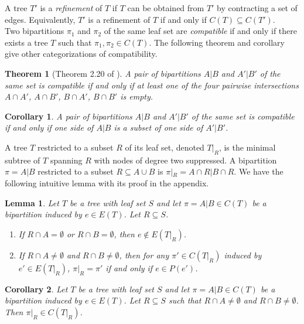 \documentclass{bmcart}
\newtheorem{theorem}{Theorem}
\newtheorem{lemma}{Lemma}
\newtheorem{corollary}{Corollary}
\begin{document}
A tree $T'$ is a \textit{refinement} of $T$ if $T$ can be obtained from $T'$ by contracting a set of edges. Equivalently, $T'$ is a refinement of $T$ if and only if $C(T) \subseteq C(T')$.\\

Two bipartitions $\pi_1$ and $\pi_2$ of the same leaf set are \textit{compatible} if and only if there exists a tree $T$ such that $\pi_1, \pi_2 \in C(T)$. The following theorem and corollary give other categorizations of compatibility.
\begin{theorem}[Theorem 2.20 of \cite{warnow2017computational}]\label{thm:compatibility}
    A pair of bipartitions $A|B$ and $A'|B'$ of the same set is compatible if and only if at least one of the four pairwise intersections $A \cap A'$, $A\cap B'$, $B\cap A'$, $B \cap B'$ is empty. 
\end{theorem}

\begin{corollary}\label{cor:compatibility}
     A pair of bipartitions $A|B$ and $A'|B'$ of the same set is compatible if and only if one side of $A|B$ is a subset of one side of $A'|B'$.
\end{corollary}
\medskip

A tree $T$ restricted to a subset $R$ of its leaf set, denoted $T|_R$, is the minimal subtree of $T$ spanning $R$ with nodes of degree two suppressed. A bipartition $\pi = A|B$ restricted to a subset $R \subseteq A\cup B$ is $\pi|_R = A\cap R | B\cap R$. We have the following intuitive lemma with its proof in the appendix.

\begin{lemma} \label{lem:bipar_restrict_edge}
    Let $T$ be a tree with leaf set $S$ and let $\pi = A|B \in C(T)$ be a bipartition induced by $e \in E(T)$. Let $R \subseteq S$.
    \begin{enumerate}
        \item If $R \cap A = \emptyset$ or $R \cap B = \emptyset$, then $e \notin E(T|_R)$.
        \item If $R \cap A \neq \emptyset$ and $R \cap B \neq \emptyset$, then for any $\pi' \in C(T|_R)$ induced by $e' \in E(T|_R)$, $\pi|_R = \pi'$ if and only if $e \in P(e')$.
    \end{enumerate}
\end{lemma}

\begin{corollary} \label{cor:bipar_restrict}
    Let $T$ be a tree with leaf set $S$ and let $\pi = A|B \in C(T)$ be a bipartition induced by $e \in E(T)$. Let $R \subseteq S$ such that $R \cap A \neq \emptyset$ and $R \cap B \neq \emptyset$. Then $\pi|_R \in C(T|_R)$. 
\end{corollary}
\end{document}
